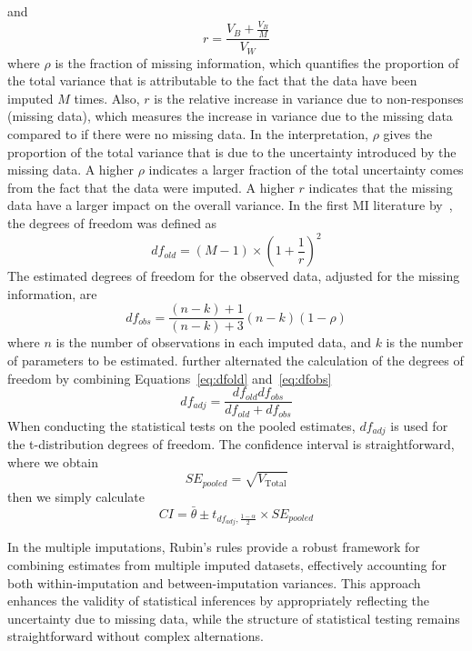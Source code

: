 and 
\begin{equation}
    r=\frac{V_B+\frac{V_B}{M}}{V_W}
\end{equation}
where $\rho$ is the fraction of missing information, which quantifies the proportion of the total variance that is attributable to the fact that the data have been imputed $M$ times. 
Also, $r$ is the relative increase in variance due to non-responses (missing data), which measures the increase in variance due to the missing data compared to if there were no missing data. 
In the interpretation, $\rho$ gives the proportion of the total variance that is due to the uncertainty introduced by the missing data. 
A higher $\rho$ indicates a larger fraction of the total uncertainty comes from the fact that the data were imputed.
A higher $r$ indicates that the missing data have a larger impact on the overall variance. 
In the first MI literature by~\citet{rubin1987multiple}, the degrees of freedom was defined as
\begin{equation}\label{eq:dfold}
    df_{old}=(M-1)\times (1+\frac{1}{r})^2
\end{equation}
The estimated degrees of freedom for the observed data, adjusted for the missing information, are
\begin{equation}\label{eq:dfobs}
    df_{obs}=\frac{(n-k)+1}{(n-k)+3}(n-k)(1-\rho)
\end{equation}
where $n$ is the number of observations in each imputed data, and $k$ is the number of parameters to be estimated.
\citet{barnard1999miscellanea} further alternated the calculation of the degrees of freedom by combining Equations~\ref{eq:dfold} and~\ref{eq:dfobs}
\begin{equation}
    df_{adj}=\frac{df_{old}df_{obs}}{df_{old}+df_{obs}}
\end{equation}
When conducting the statistical tests on the pooled estimates, $df_{adj}$ is used for the t-distribution degrees of freedom. 
The confidence interval is straightforward, where we obtain 
\begin{equation}
    SE_{pooled}=\sqrt{V_{\text{Total}}}
\end{equation}
then we simply calculate 
\begin{equation}
    CI=\bar{\theta}\pm t_{df_{adj},\frac{1-\alpha}{2}}\times SE_{pooled}
\end{equation}

In the multiple imputations, Rubin's rules provide a robust framework for combining estimates from multiple imputed datasets, effectively accounting for both within-imputation and between-imputation variances. 
This approach enhances the validity of statistical inferences by appropriately reflecting the uncertainty due to missing data, while the structure of statistical testing remains straightforward without complex alternations.